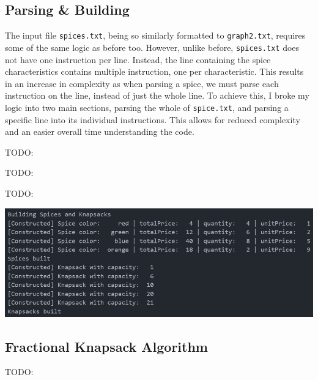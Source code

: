 \documentclass[12pt, letterpaper]{article}
\begin{document}
\subsection{Parsing \& Building} \label{SpiceKnapsack_ParseBuild}
The input file \texttt{spices.txt}, being so similarly formatted to \texttt{graph2.txt}, requires some of the same logic as before too.
However, unlike before, \texttt{spices.txt} does not have one instruction per line.
Instead, the line containing the spice characteristics contains multiple instruction, one per characteristic.
This results in an increase in complexity as when parsing a spice, we must parse each instruction on the line, instead of just the whole line.
\vspace*{5px}
\newline
To achieve this, I broke my logic into two main sections, parsing the whole of \texttt{spice.txt}, and parsing a specific line into its individual instructions.
This allows for reduced complexity and an easier overall time understanding the code.
\begin{center}
   
\end{center}
TODO:
\begin{center}
   
\end{center}
TODO:
\begin{center}
   
\end{center}
TODO:
\begin{center}
   \includegraphics{images/SpiceKnapsack_ParseBuild.png}
\end{center}

\subsection{Fractional Knapsack Algorithm} \label{SpiceKnapsack_FKA}
TODO:
\end{document}
